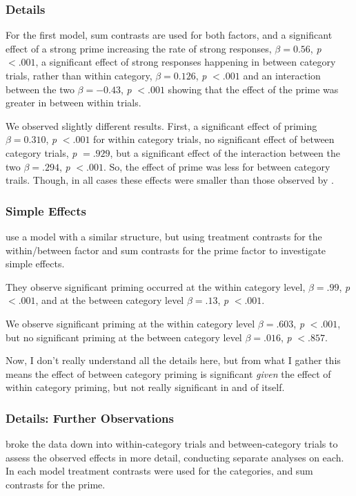 \documentclass[noamssymb]{beamer}
\begin{document}
\begin{frame}
  \frametitle{{\ftf Details}}

  For the first model, sum contrasts are used for both factors, and a significant effect of a strong prime increasing the rate of strong responses, \(\beta = 0.56\), \emph{p} \(< .001\), a significant effect of strong responses happening in between category trials, rather than within category, \(\beta = 0.126\), \emph{p} \(< .001\) and an interaction between the two \(\beta = -0.43\), \emph{p} \(< .001\) showing that the effect of the prime was greater in between within trials.

We observed slightly different results.
First, a significant effect of priming \(\beta = 0.310\), \emph{p} \(<.001\) for within category trials, no significant effect of between category trials, \emph{p} \(= .929\), but a significant effect of the interaction between the two \(\beta = .294\), \emph{p} \(<.001\).
So, the effect of prime was less for between category trails.
Though, in all cases these effects were smaller than those observed by \citeauthor{Bott:2016aa}.
\end{frame}

\begin{frame}
  \frametitle{{\ftf Simple Effects}}
  \citeauthor{Bott:2016aa} use a model with a similar structure, but using treatment contrasts for the within/between factor and sum contrasts for the prime factor to investigate simple effects.

  They observe significant priming occurred at the within category level, \(\beta = .99\), \emph{p} \(< .001\), and at the between category level \(\beta = .13\), \emph{p} \(< .001\).

  We observe significant priming at the within category level \(\beta = .603\), \emph{p} \(<.001\), but no significant priming at the between category level \(\beta = .016\), \emph{p} \(< .857\).

  Now, I don't really understand all the details here, but from what I gather this means the effect of between category priming is significant \emph{given} the effect of within category priming, but not really significant in and of itself.

\end{frame}


\begin{frame}
  \frametitle{{\ftf Details: Further Observations}}

  \citeauthor{Bott:2016aa} broke the data down into within-category trials and between-category trials to assess the observed effects in more detail, conducting separate analyses on each.
  In each model treatment contrasts were used for the categories, and sum contrasts for the prime.

\end{frame}
\end{document}

